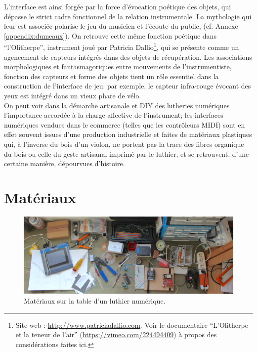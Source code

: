 \indent L'interface est ainsi forgée par la force d'évocation poétique des objets, qui dépasse le strict cadre fonctionnel de la relation instrumentale. La mythologie qui leur est associée polarise le jeu du musicien et l'écoute du public,  (cf. Annexe \ref{appendix:dumeaux}). On retrouve cette même fonction poétique dans ``l'Olitherpe'', instrument joué par Patricia Dallio\footnote{Site web : \url{http://www.patriciadallio.com}. Voir le documentaire ``L'Olitherpe et la teneur de l'air'' (\url{https://vimeo.com/224494409}) à propos des considérations faites ici.}, qui se présente comme un agencement de capteurs intégrés dans des objets de récupération. Les associations morphologiques et fantasmagoriques entre mouvements de l'instrumentiste, fonction des capteurs et forme des objets tient un rôle essentiel dans la construction de l'interface de jeu: par exemple, le capteur infra-rouge évocant des yeux est intégré dans un vieux phare de vélo.\\
\indent On peut voir dans la démarche artisanale et \gls{DIY} des lutheries numériques l'importance accordée à la charge affective de l'instrument; les interfaces numériques vendues dans le commerce (telles que les contrôleurs \gls{MIDI}) sont en effet souvent issues d'une production industrielle et faites de matériaux plastiques qui, à l'inverse du bois d'un violon, ne portent pas la trace des fibres organique du bois ou celle du geste artisanal imprimé par le luthier, et se retrouvent, d'une certaine manière, dépourvues d'histoire.

\section{Matériaux}
\label{sec:interfaces:materials}

\begin{figure}[!htbp]
	\captionsetup{format=plain}%
	\includegraphics[width=\textwidth]{gfx/05_interfaces/lutherie-worktable.jpg}
	\caption[Matériaux sur la table d'un luthier numérique]{Matériaux sur la table d'un luthier numérique.}
	\label{fig:interface:table-luthier}
\end{figure}

